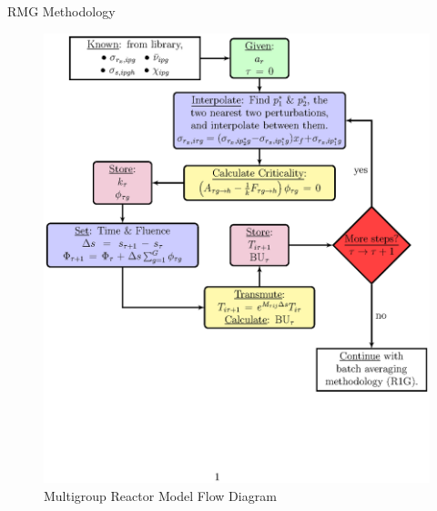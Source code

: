 \documentclass[pdf, autumn, slideColor, nocolorBG]{prosper}
\begin{document}
\begin{slide}{RMG Methodology}
\begin{center}
\begin{figure}
\caption{Multigroup Reactor Model Flow Diagram}
\includegraphics[scale=0.45, clip, trim=1.5cm 6.75cm 1.5cm 6.75cm]{figs/method_diagram.ps}
\end{figure}
\end{center}
\end{slide}
\end{document}
